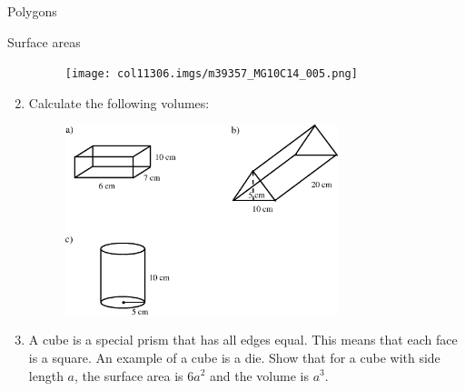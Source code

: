 \begin{exercises}{Polygons}
\begin{exercises}{Surface areas }
\begin{enumerate}[noitemsep, label=\textbf{\arabic*}. ]
    \setcounter{subfigure}{0}


	\begin{figure}[H] %
    \begin{center}
    \label{m39357*id63037!!!underscore!!!media}\label{m39357*id63037!!!underscore!!!printimage}\texttt{[image: col11306.imgs/m39357\_MG10C14\_005.png]} %
        
      \vspace{2pt}
    \vspace{.1in}
    
    \end{center}

 \end{figure}   

    \addtocounter{footnote}{-0}
            \label{m39357*uid18}\item Calculate the following volumes:

    \setcounter{subfigure}{0}


	\begin{figure}[H] %
    \begin{center}
    \label{m39357*id63058!!!underscore!!!media}\label{m39357*id63058!!!underscore!!!printimage}\includegraphics[width=300px]{col11306.imgs/m39357_MG10C14_006.png} %
        
      \vspace{2pt}
    \vspace{.1in}
    
    \end{center}

 \end{figure}   

    \addtocounter{footnote}{-0}
            \label{m39357*uid19}\item A cube is a special prism that has all edges equal. This means that each face is a square. An example of a cube is a die. Show that for a cube with side length $a$, the surface area is $6{a}^{2}$ and the volume is ${a}^{3}$.


\end{enumerate}
\end{exercises}
\end{exercises}
